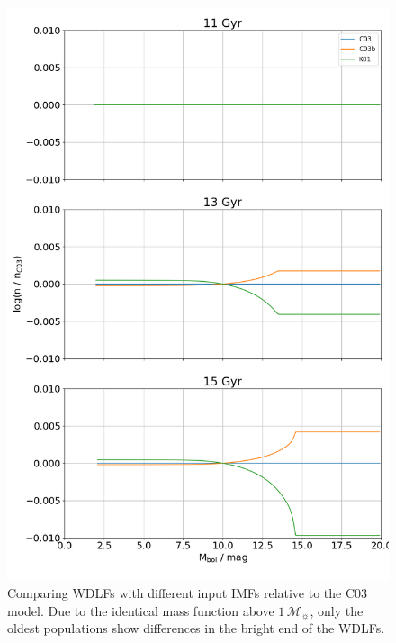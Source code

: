 \documentclass[fleqn,usenatbib]{rasti}
\newcommand{\msun}{\mathcal{M}_{\sun}}
\begin{document}
\begin{figure}
    \centering
    \includegraphics[width=\columnwidth]{wdlf_compare_imf.png}
    \caption{Comparing WDLFs with different input IMFs relative to the C03
    model. Due to the identical mass function above $1\,\msun$, only the
    oldest populations show differences in the bright end of the WDLFs.}
    \label{fig:wdlf_compare_imf}
\end{figure}
\end{document}
